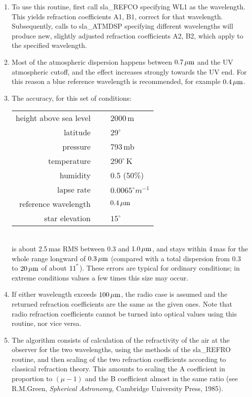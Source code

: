 \documentclass[11pt,twoside]{article}
\newcommand{\arcseci}[1] {$#1\hspace{-0.05em}$\raisebox{-0.5ex}
                         {$^{'\hspace{-0.1em}'}$}}
\renewcommand{\arcseci}[1] {$#1\hspace{-0.05em}^{'\hspace{-0.1em}'}$}
\begin{document}
{
 \begin{enumerate}
  \item To use this routine, first call sla\_REFCO specifying WL1 as the
        wavelength.  This yields refraction coefficients A1, B1, correct
        for that wavelength.  Subsequently, calls to sla\_ATMDSP specifying
        different wavelengths will produce new, slightly adjusted
        refraction coefficients A2, B2, which apply to the specified wavelength.
  \item Most of the atmospheric dispersion happens between $0.7\,\mu{\rm m}$
        and the UV atmospheric cutoff, and the effect increases strongly
        towards the UV end.  For this reason a blue reference wavelength
        is recommended, for example $0.4\,\mu{\rm m}$.
  \item The accuracy, for this set of conditions: \\[1pc]
   \hspace*{5ex} \begin{tabular}{rcl}
        height above sea level & ~ & 2000\,m \\
                      latitude & ~ & $29^\circ$ \\
                      pressure & ~ & 793\,mb \\
                   temperature & ~ & $290^\circ$\,K \\
                      humidity & ~ & 0.5 (50\%) \\
                    lapse rate & ~ & $0.0065^\circ m^{-1}$ \\
          reference wavelength & ~ & $0.4\,\mu{\rm m}$ \\
                star elevation & ~ & $15^\circ$ \\
                  \end{tabular}\\[1pc]
        is about 2.5\,mas RMS between 0.3 and $1.0\,\mu{\rm m}$, and stays
        within 4\,mas for the whole range longward of $0.3\,\mu{\rm m}$
        (compared with a total dispersion from 0.3 to $20\,\mu{\rm m}$
        of about \arcseci{11}).  These errors are typical for ordinary
        conditions;  in extreme conditions values a few times this size
        may occur.
  \item If either wavelength exceeds $100\,\mu{\rm m}$, the radio case
        is assumed and the returned refraction coefficients are the
        same as the given ones. Note that radio refraction coefficients
        cannot be turned into optical values using this routine, nor
        vice versa.
  \item The algorithm consists of calculation of the refractivity of the
        air at the observer for the two wavelengths, using the methods
        of the sla\_REFRO routine, and then scaling of the two refraction
        coefficients according to classical refraction theory.  This
        amounts to scaling the A coefficient in proportion to $(\mu-1)$ and
        the B coefficient almost in the same ratio (see R.M.Green,
        {\it Spherical Astronomy,}\/ Cambridge University Press, 1985).
 \end{enumerate}
}
\end{document}
